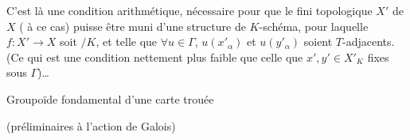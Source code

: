 C'est là une condition arithmétique, nécessaire pour que le  fini  topologique $X'$ de $X$ ( à ce cas) puisse  être muni d'une  structure de $K$-schéma, pour laquelle $f:X'\to X$ soit $ /K$, et telle que  $\forall u\in\Gamma$, $u(x'_\alpha)$ et $u(y'_\alpha)$ soient $T$-adjacents. (Ce qui est une condition nettement plus faible que celle que $x',y'\in X'_K$  fixes sous $\Gamma$)\ldots
{}


Groupoïde fondamental d'une carte trouée

(préliminaires à l'action de Galois)


